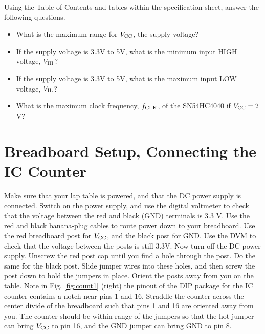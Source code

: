 \documentclass{article}
\begin{document}
\noindent
Using the Table of Contents and tables within the specification sheet, answer the following questions.
\begin{itemize}
\item What is the maximum range for $V_{\rm CC}$, the supply voltage? \vspace{0.25cm}
\item If the supply voltage is 3.3V to 5V, what is the minimum input HIGH voltage, $V_{\rm IH}$? \vspace{0.25cm}
\item If the supply voltage is 3.3V to 5V, what is the maximum input LOW voltage, $V_{\rm IL}$? \vspace{0.25cm}
\item What is the maximum clock frequency, $f_{\rm CLK}$, of the SN54HC4040 if $V_{\rm CC} = 2$V? \vspace{0.25cm}
\end{itemize}

\section{Breadboard Setup, Connecting the IC Counter}

Make sure that your lap table is powered, and that the DC power supply is connected.  Switch on the power supply, and use the digital voltmeter to check that the voltage between the red and black (GND) terminals is 3.3 V.  Use the red and black banana-plug cables to route power down to your breadboard.  Use the red breadboard post for $V_{\rm CC}$, and the black post for GND.  Use the DVM to check that the voltage between the posts is still 3.3V.  Now turn off the DC power supply.  Unscrew the red post cap until you find a hole through the post.  Do the same for the black post.  Slide jumper wires into these holes, and then screw the post down to hold the jumpers in place.  Orient the posts away from you on the table.  Note in Fig. \ref{fig:count1} (right) the pinout of the DIP package for the IC counter contains a notch near pins 1 and 16.  Straddle the counter across the center divide of the breadboard such that pins 1 and 16 are oriented away from you.  The counter should be within range of the jumpers so that the hot jumper can bring $V_{\rm CC}$ to pin 16, and the GND jumper can bring GND to pin 8.
 
\end{document}
